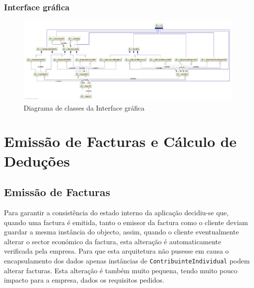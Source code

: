\documentclass[12pt,a4paper]{report}
\begin{document}
    \subsection{Interface gráfica}
    \begin{figure}[H]
        \centering
        \includegraphics[width=\textwidth]{./images/guiFull.png}
        \caption{Diagrama de classes da Interface gráfica}
    \end{figure}

\chapter{Emissão de Facturas e Cálculo de Deduções}
\label{chp:emissao}

\section{Emissão de Facturas}
    Para garantir a consistência do estado interno da aplicação decidiu-se que,
    quando uma factura é emitida, tanto o emissor da factura como o cliente
    deviam guardar a mesma instância do objecto, assim, quando o cliente
    eventualmente alterar o sector económico da factura, esta alteração é
    automaticamente verificada pela empresa. Para que esta arquitetura não
    pusesse em causa o encapsulamento dos dados apenas instâncias de
    \texttt{ContribuinteIndividual} podem alterar facturas. Esta
    alteração é também muito pequena, tendo muito pouco impacto para a empresa,
    dados os requisitos pedidos.
\end{document}
